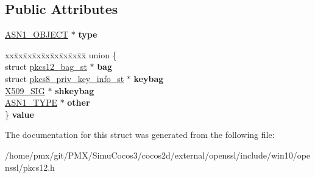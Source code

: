 \subsection*{Public Attributes}
\begin{DoxyCompactItemize}
\item 
\mbox{\label{structPKCS12__SAFEBAG_a7e25098bf7d75c05613960d6c9a0e554}} 
\hyperlink{structasn1__object__st}{A\+S\+N1\+\_\+\+O\+B\+J\+E\+CT} $\ast$ {\bfseries type}
\item 
\mbox{\label{structPKCS12__SAFEBAG_a2579326cece6ee541ea392d37a57c1ab}} 
\begin{tabbing}
xx\=xx\=xx\=xx\=xx\=xx\=xx\=xx\=xx\=\kill
union \{\\
\>struct \hyperlink{structpkcs12__bag__st}{pkcs12\_bag\_st} $\ast$ {\bfseries bag}\\
\>struct \hyperlink{structpkcs8__priv__key__info__st}{pkcs8\_priv\_key\_info\_st} $\ast$ {\bfseries keybag}\\
\>\hyperlink{structX509__sig__st}{X509\_SIG} $\ast$ {\bfseries shkeybag}\\
\>\hyperlink{structasn1__type__st}{ASN1\_TYPE} $\ast$ {\bfseries other}\\
\} {\bfseries value}\\

\end{tabbing}\end{DoxyCompactItemize}


The documentation for this struct was generated from the following file\+:\begin{DoxyCompactItemize}
\item 
/home/pmx/git/\+P\+M\+X/\+Simu\+Cocos3/cocos2d/external/openssl/include/win10/openssl/pkcs12.\+h\end{DoxyCompactItemize}

